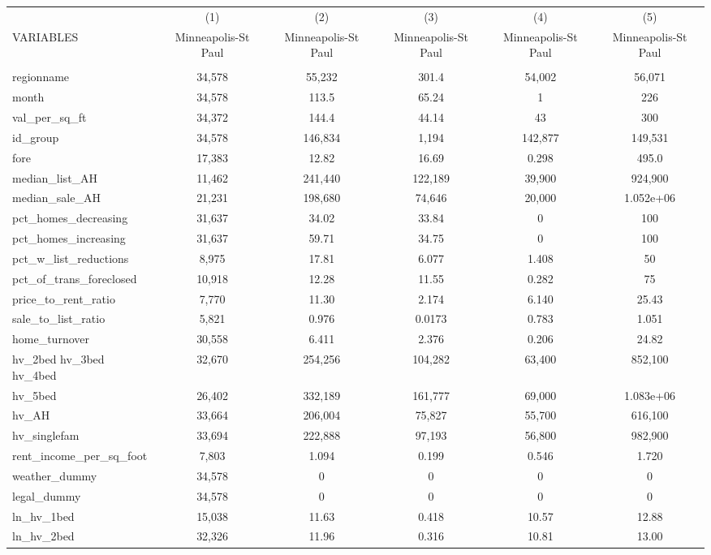 \begin{tabular}{lccccc} \hline
 & (1) & (2) & (3) & (4) & (5) \\
VARIABLES & Minneapolis-St Paul & Minneapolis-St Paul & Minneapolis-St Paul & Minneapolis-St Paul & Minneapolis-St Paul \\ \hline
 &  &  &  &  &  \\
regionname & 34,578 & 55,232 & 301.4 & 54,002 & 56,071 \\
month & 34,578 & 113.5 & 65.24 & 1 & 226 \\
val\_per\_sq\_ft & 34,372 & 144.4 & 44.14 & 43 & 300 \\
id\_group & 34,578 & 146,834 & 1,194 & 142,877 & 149,531 \\
fore & 17,383 & 12.82 & 16.69 & 0.298 & 495.0 \\
median\_list\_AH & 11,462 & 241,440 & 122,189 & 39,900 & 924,900 \\
median\_sale\_AH & 21,231 & 198,680 & 74,646 & 20,000 & 1.052e+06 \\
pct\_homes\_decreasing & 31,637 & 34.02 & 33.84 & 0 & 100 \\
pct\_homes\_increasing & 31,637 & 59.71 & 34.75 & 0 & 100 \\
pct\_w\_list\_reductions & 8,975 & 17.81 & 6.077 & 1.408 & 50 \\
pct\_of\_trans\_foreclosed & 10,918 & 12.28 & 11.55 & 0.282 & 75 \\
price\_to\_rent\_ratio & 7,770 & 11.30 & 2.174 & 6.140 & 25.43 \\
sale\_to\_list\_ratio & 5,821 & 0.976 & 0.0173 & 0.783 & 1.051 \\
home\_turnover & 30,558 & 6.411 & 2.376 & 0.206 & 24.82 \\
hv\_2bed 
hv\_3bed 
hv\_4bed & 32,670 & 254,256 & 104,282 & 63,400 & 852,100 \\
hv\_5bed & 26,402 & 332,189 & 161,777 & 69,000 & 1.083e+06 \\
hv\_AH & 33,664 & 206,004 & 75,827 & 55,700 & 616,100 \\
hv\_singlefam & 33,694 & 222,888 & 97,193 & 56,800 & 982,900 \\
rent\_income\_per\_sq\_foot & 7,803 & 1.094 & 0.199 & 0.546 & 1.720 \\
weather\_dummy & 34,578 & 0 & 0 & 0 & 0 \\
legal\_dummy & 34,578 & 0 & 0 & 0 & 0 \\
ln\_hv\_1bed & 15,038 & 11.63 & 0.418 & 10.57 & 12.88 \\
ln\_hv\_2bed & 32,326 & 11.96 & 0.316 & 10.81 & 13.00 \\

\end{tabular}
